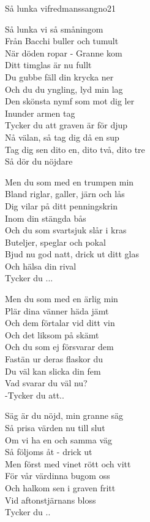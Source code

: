 \begin{song}{Så lunka vi}{fredmanssangno21}
\begin{vers}
Så lunka vi så småningom\\
Från Bacchi buller och tumult\\
När döden ropar - Granne kom\\
Ditt timglas är nu fullt\\
Du gubbe fäll din krycka ner\\
Och du du yngling, lyd min lag\\
Den skönsta nymf som mot dig ler\\
Inunder armen tag\\
Tycker du att graven är för djup\\
Nå välan, så tag dig då en sup\\
Tag dig sen dito en, dito två, dito tre\\
Så dör du nöjdare\\
\end{vers}
\begin{vers}
Men du som med en trumpen min\\
Bland riglar, galler, järn och lås\\
Dig vilar på ditt penningskrin\\
Inom din stängda bås\\
Och du som svartsjuk slår i kras\\
Buteljer, speglar och pokal\\
Bjud nu god natt, drick ut ditt glas\\
Och hälsa din rival\\
Tycker du ...\\
\end{vers}
\newp
\begin{vers}
Men du som med en ärlig min\\
Plär dina vänner häda jämt\\
Och dem förtalar vid ditt vin\\
Och det liksom på skämt\\
Och du som ej försvarar dem\\
Fastän ur deras flaskor du\\
Du väl kan slicka din fem\\
Vad svarar du väl nu?\\
-Tycker du att..\\
\end{vers}
\begin{vers}
Säg är du nöjd, min granne säg\\
Så prisa värden nu till slut\\
Om vi ha en och samma väg\\
Så följoms åt - drick ut\\
Men först med vinet rött och vitt\\
För vår värdinna bugom oss\\
Och halkom sen i graven fritt\\
Vid aftonstjärnans bloss\\
Tycker du ..\\
\end{vers}
\end{song}
